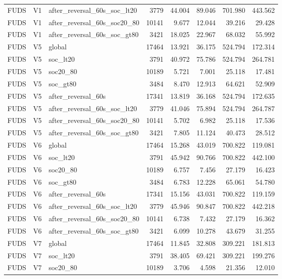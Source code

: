 \begin{tabular}{lllrrrrr}
FUDS & V1 & after\_reversal\_60s\_soc\_lt20 & 3779 & 44.004 & 89.046 & 701.980 & 443.562 \\
FUDS & V1 & after\_reversal\_60s\_soc20\_80 & 10141 & 9.677 & 12.044 & 39.216 & 29.428 \\
FUDS & V1 & after\_reversal\_60s\_soc\_gt80 & 3421 & 18.025 & 22.967 & 68.032 & 55.992 \\
FUDS & V5 & global & 17464 & 13.921 & 36.175 & 524.794 & 172.314 \\
FUDS & V5 & soc\_lt20 & 3791 & 40.972 & 75.786 & 524.794 & 264.781 \\
FUDS & V5 & soc20\_80 & 10189 & 5.721 & 7.001 & 25.118 & 17.481 \\
FUDS & V5 & soc\_gt80 & 3484 & 8.470 & 12.913 & 64.621 & 52.909 \\
FUDS & V5 & after\_reversal\_60s & 17341 & 13.819 & 36.168 & 524.794 & 172.635 \\
FUDS & V5 & after\_reversal\_60s\_soc\_lt20 & 3779 & 41.046 & 75.894 & 524.794 & 264.787 \\
FUDS & V5 & after\_reversal\_60s\_soc20\_80 & 10141 & 5.702 & 6.982 & 25.118 & 17.536 \\
FUDS & V5 & after\_reversal\_60s\_soc\_gt80 & 3421 & 7.805 & 11.124 & 40.473 & 28.512 \\
FUDS & V6 & global & 17464 & 15.268 & 43.019 & 700.822 & 119.081 \\
FUDS & V6 & soc\_lt20 & 3791 & 45.942 & 90.766 & 700.822 & 442.100 \\
FUDS & V6 & soc20\_80 & 10189 & 6.757 & 7.456 & 27.179 & 16.423 \\
FUDS & V6 & soc\_gt80 & 3484 & 6.783 & 12.228 & 65.061 & 54.780 \\
FUDS & V6 & after\_reversal\_60s & 17341 & 15.156 & 43.031 & 700.822 & 119.159 \\
FUDS & V6 & after\_reversal\_60s\_soc\_lt20 & 3779 & 45.946 & 90.847 & 700.822 & 442.218 \\
FUDS & V6 & after\_reversal\_60s\_soc20\_80 & 10141 & 6.738 & 7.432 & 27.179 & 16.362 \\
FUDS & V6 & after\_reversal\_60s\_soc\_gt80 & 3421 & 6.099 & 10.278 & 43.679 & 31.255 \\
FUDS & V7 & global & 17464 & 11.845 & 32.808 & 309.221 & 181.813 \\
FUDS & V7 & soc\_lt20 & 3791 & 38.405 & 69.421 & 309.221 & 199.276 \\
FUDS & V7 & soc20\_80 & 10189 & 3.706 & 4.598 & 21.356 & 12.010 \\

\end{tabular}

